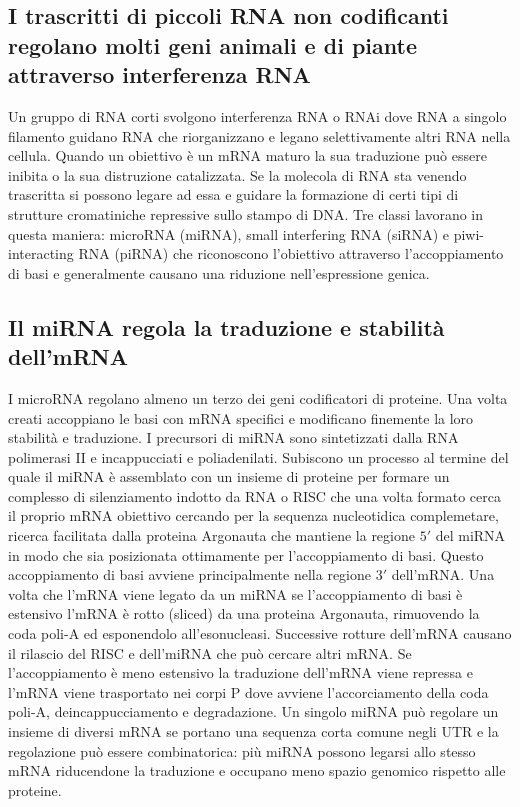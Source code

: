 \subsection{I trascritti di piccoli RNA non codificanti regolano molti geni animali e di piante attraverso interferenza RNA}
Un gruppo di RNA corti svolgono interferenza RNA o RNAi dove RNA a singolo filamento guidano RNA che riorganizzano e legano selettivamente altri RNA nella cellula. Quando un obiettivo 
\`e un mRNA maturo la sua traduzione pu\`o essere inibita o la sua distruzione catalizzata. Se la molecola di RNA sta venendo trascritta si possono legare ad essa e guidare la formazione
di certi tipi di strutture cromatiniche repressive sullo stampo di DNA. Tre classi lavorano in questa maniera: microRNA (miRNA), small interfering RNA (siRNA) e piwi-interacting RNA
(piRNA) che riconoscono l'obiettivo attraverso l'accoppiamento di basi e generalmente causano una riduzione nell'espressione genica.
\subsection{Il miRNA regola la traduzione e stabilit\`a dell'mRNA}
I microRNA regolano almeno un terzo dei geni codificatori di proteine. Una volta creati accoppiano le basi con mRNA specifici e modificano finemente la loro stabilit\`a e traduzione.
I precursori di miRNA sono sintetizzati dalla RNA polimerasi II e incappucciati e poliadenilati. Subiscono un processo al termine del quale il miRNA \`e assemblato con un insieme di
proteine per formare un complesso di silenziamento indotto da RNA o RISC che una volta formato cerca il proprio mRNA obiettivo cercando per la sequenza nucleotidica complemetare,
ricerca facilitata dalla proteina Argonauta che mantiene la regione $5'$ del miRNA in modo che sia posizionata ottimamente per l'accoppiamento di basi. Questo accoppiamento di basi 
avviene principalmente nella regione $3'$ dell'mRNA. Una volta che l'mRNA viene legato da un miRNA se l'accoppiamento di basi \`e estensivo l'mRNA \`e rotto (sliced) da una proteina
Argonauta, rimuovendo  la coda poli-A ed esponendolo all'esonucleasi. Successive rotture dell'mRNA causano il rilascio del RISC e dell'miRNA che pu\`o cercare altri mRNA. Se 
l'accoppiamento \`e meno estensivo la traduzione dell'mRNA viene repressa e l'mRNA viene trasportato nei corpi P dove avviene l'accorciamento della coda poli-A, deincappucciamento e 
degradazione. Un singolo miRNA pu\`o regolare un insieme di diversi mRNA se portano una sequenza corta comune negli UTR e la regolazione pu\`o essere combinatorica: pi\`u miRNA possono
legarsi allo stesso mRNA riducendone la traduzione e occupano meno spazio genomico rispetto alle proteine.
